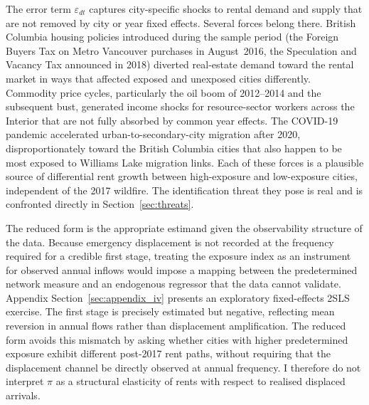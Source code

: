 \documentclass[12pt]{article}
\begin{document}
%
The error term $\varepsilon_{dt}$ captures city-specific shocks to rental
demand and supply that are not removed by city or year fixed effects. Several
forces belong there. British Columbia housing policies introduced during the
sample period (the Foreign Buyers Tax on Metro Vancouver purchases in
August~2016, the Speculation and Vacancy Tax announced in 2018) diverted
real-estate demand toward the rental market in ways that affected exposed and
unexposed cities differently. Commodity price cycles, particularly the oil
boom of 2012--2014 and the subsequent bust, generated income shocks for
resource-sector workers across the Interior that are not fully absorbed by
common year effects. The COVID-19 pandemic accelerated urban-to-secondary-city
migration after 2020, disproportionately toward the British Columbia cities
that also happen to be most exposed to Williams Lake migration links. Each of
these forces is a plausible source of differential rent growth between
high-exposure and low-exposure cities, independent of the 2017 wildfire. The
identification threat they pose is real and is confronted directly in
Section~\ref{sec:threats}.

The reduced form is the appropriate estimand given the observability structure of
the data. Because emergency displacement is not recorded at the frequency
required for a credible first stage, treating the exposure index as an instrument
for observed annual inflows would impose a mapping between the predetermined
network measure and an endogenous regressor that the data cannot validate.
Appendix Section~\ref{sec:appendix_iv} presents an exploratory fixed-effects
2SLS exercise.
The first stage is precisely estimated but negative,
reflecting mean reversion in annual flows rather than displacement amplification.
The reduced form avoids this mismatch by asking whether
cities with higher predetermined exposure exhibit different post-2017 rent paths,
without requiring that the displacement channel be directly observed at annual
frequency. I therefore do not interpret $\pi$ as a structural elasticity of rents
with respect to realised displaced arrivals.
\end{document}
